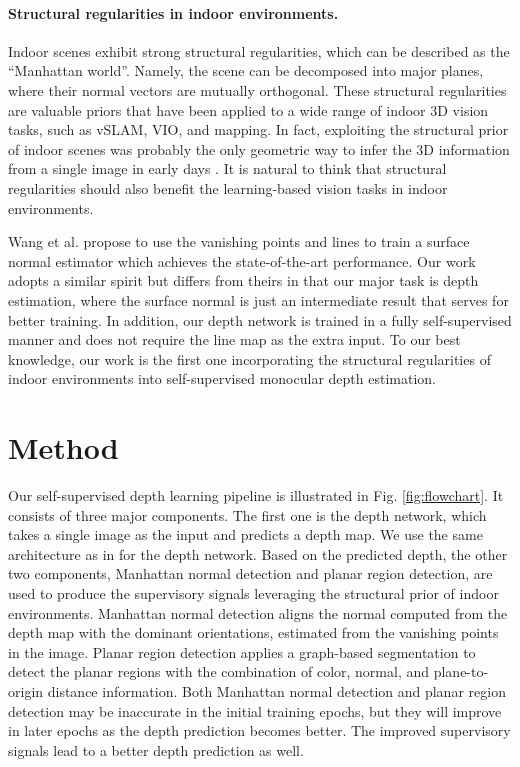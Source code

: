 \documentclass[10pt,twocolumn,letterpaper]{article}
\newcommand{\Fig}[1]{Fig. \ref{#1}}
\begin{document}
\paragraph{Structural regularities in indoor environments.}
Indoor scenes exhibit strong structural regularities, which can be described as the “Manhattan world”. Namely, the scene can be decomposed into major planes, where their normal vectors are mutually orthogonal. These structural regularities are valuable priors that have been applied to a wide range of indoor 3D vision tasks, such as vSLAM\cite{zhou2015structslam}\cite{flint2010growing}\cite{yang2016pop}, VIO\cite{zou2019structvio}, and mapping\cite{furukawa2009manhattan}\cite{furukawa2009reconstructing}\cite{concha2014manhattan}.
In fact, exploiting the structural prior of indoor scenes was probably the only geometric way to infer the 3D information from a single image in early days \cite{delage2006dynamic}\cite{lee2009geometric}. It is natural to think that structural regularities should also benefit the learning-based vision tasks in indoor environments.

Wang et al. \cite{wang2020vplnet} propose to use the vanishing points and lines to train a surface normal estimator which achieves the state-of-the-art performance. Our work adopts a similar spirit but differs from theirs in that our major task is depth estimation, where the surface normal is just an intermediate result that serves for better training. In addition, our depth network is trained in a fully self-supervised manner and does not require the line map as the extra input.
To our best knowledge, our work is the first one incorporating the structural regularities of indoor environments into self-supervised monocular depth estimation.

\section{Method}

Our self-supervised depth learning pipeline is illustrated in \Fig{fig:flowchart}. It consists of three major components. The first one is the depth network, which takes a single image as the input and predicts a depth map. We use the same architecture as in \cite{yu2020p} for the depth network. Based on the predicted depth, the other two components, Manhattan normal detection and planar region detection, are used to produce the supervisory signals leveraging the structural prior of indoor environments.	
Manhattan normal detection aligns the normal computed from the depth map with the dominant orientations, estimated from the vanishing points in the image. Planar region detection applies a graph-based segmentation to detect the planar regions with the combination of color, normal, and plane-to-origin distance information. Both Manhattan normal detection and planar region detection may be inaccurate in the initial training epochs, but they will improve in later epochs as the depth prediction becomes better. The improved supervisory signals lead to a better depth prediction as well.
\end{document}
